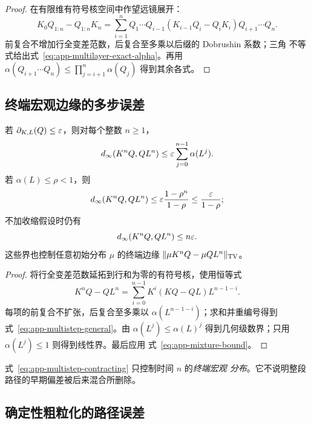 \begin{proof}
在有限维有符号核空间中作望远镜展开：
\[
 K_0Q_{1:n}-Q_{1:n}K_n
 =\sum_{i=1}^n Q_1\cdots Q_{i-1}
   (K_{i-1}Q_i-Q_iK_i)Q_{i+1}\cdots Q_n.
\]
前复合不增加行全变差范数，后复合至多乘以后缀的 Dobrushin 系数；三角
不等式给出式~\eqref{eq:app-multilayer-exact-alpha}。再用
$\alpha(Q_{i+1}\cdots Q_n)\le\prod_{j=i+1}^n\alpha(Q_j)$ 得到其余各式。
\end{proof}

\subsection{终端宏观边缘的多步误差}

\begin{theorem}
\label{thm:app-multistep-marginal}
若 $\partial_{K,L}(Q)\le\varepsilon$，则对每个整数 $n\ge1$，
\begin{equation}
 d_\infty(K^nQ,QL^n)
 \le \varepsilon\sum_{j=0}^{n-1}\alpha(L^j).
 \label{eq:app-multistep-general}
\end{equation}
若 $\alpha(L)\le\rho<1$，则
\begin{equation}
 d_\infty(K^nQ,QL^n)
 \le\varepsilon\frac{1-\rho^n}{1-\rho}
 \le\frac{\varepsilon}{1-\rho};
 \label{eq:app-multistep-contracting}
\end{equation}
不加收缩假设时仍有
\begin{equation}
 d_\infty(K^nQ,QL^n)\le n\varepsilon.
 \label{eq:app-multistep-linear}
\end{equation}
这些界也控制任意初始分布 $\mu$ 的终端边缘
$\|\mu K^nQ-\mu QL^n\|_{\operatorname{TV}}$。
\end{theorem}

\begin{proof}
将行全变差范数延拓到行和为零的有符号核，使用恒等式
\[
 K^nQ-QL^n
 =\sum_{i=0}^{n-1}K^i(KQ-QL)L^{n-1-i}.
\]
每项的前复合不扩张，后复合至多乘以
$\alpha(L^{n-1-i})$；求和并重编号得到
式~\eqref{eq:app-multistep-general}。由
$\alpha(L^j)\le\alpha(L)^j$ 得到几何级数界；只用
$\alpha(L^j)\le1$ 则得到线性界。最后应用
式~\eqref{eq:app-mixture-bound}。
\end{proof}

式~\eqref{eq:app-multistep-contracting} 只控制时间 $n$ 的\emph{终端宏观
分布}。它不说明整段路径的早期偏差被后来混合所删除。

\subsection{确定性粗粒化的路径误差}

